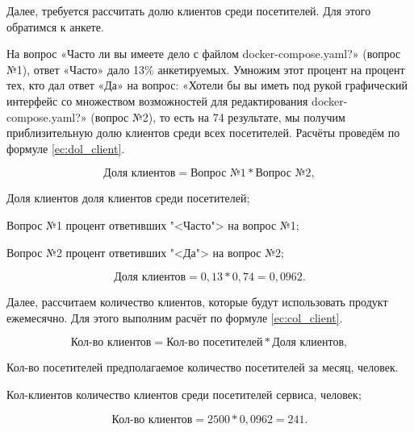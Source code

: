 Далее, требуется рассчитать долю клиентов среди посетителей. Для
этого обратимся к анкете.

На вопрос «Часто ли вы имеете дело с файлом docker-compose.yaml?»
(вопрос №1), ответ «Часто» дало 13\% анкетируемых. Умножим этот процент
на процент тех, кто дал ответ «Да» на вопрос: «Хотели бы вы иметь под
рукой графический интерфейс со множеством возможностей для
редактирования docker-compose.yaml?» (вопрос №2), то есть на 74%
результате, мы получим приблизительную долю клиентов среди всех
посетителей. Расчёты проведём по формуле \ref{ec:dol_client}.

\begin{equation}
    \label{ec:dol_client}
    \text{Доля клиентов} = \text{Вопрос №1} * \text{Вопрос №2},
\end{equation}

\begin{eqexpl}[15ex]
    \item{Доля клиентов} доля клиентов среди посетителей;
    \item{Вопрос №1} процент ответивших "<Часто"> на вопрос №1;
    \item{Вопрос №2} процент ответивших "<Да"> на вопрос №2; 
\end{eqexpl}

\begin{equation*}
    \text{Доля клиентов} = 0,13 * 0,74 = 0,0962.
\end{equation*}

Далее, рассчитаем количество клиентов, которые будут использовать
продукт ежемесячно. Для этого выполним расчёт по формуле \ref{ec:col_client}.

\begin{equation}
    \label{ec:col_client}
    \text{Кол-во клиентов} = \text{Кол-во посетителей} * \text{Доля клиентов},
\end{equation}

\begin{eqexpl}[19ex]
    \item{Кол-во посетителей}  предполагаемое количество посетителей за
    месяц, человек.
    \item{Кол-клиентов} количество клиентов среди посетителей сервиса,
    человек;
\end{eqexpl}

\begin{equation*}
    \text{Кол-во клиентов} = 2 500 * 0,0962 = 241.
\end{equation*}


